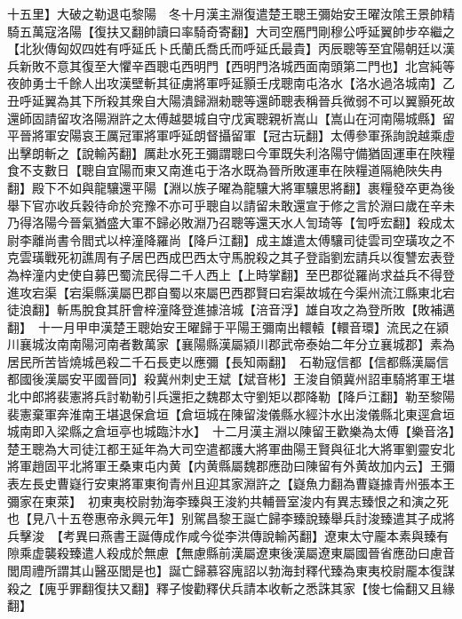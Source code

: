 十五里】大破之勒退屯黎陽　冬十月漢主淵復遣楚王聰王彌始安王曜汝隂王景帥精騎五萬寇洛陽【復扶又翻帥讀曰率騎奇寄翻】大司空鴈門剛穆公呼延翼帥步卒繼之【北狄傳匈奴四姓有呼延氏卜氏蘭氏喬氏而呼延氏最貴】丙辰聰等至宜陽朝廷以漢兵新敗不意其復至大懼辛酉聰屯西明門【西明門洛城西面南頭第二門也】北宫純等夜帥勇士千餘人出攻漢壁斬其征虜將軍呼延顥壬戌聰南屯洛水【洛水過洛城南】乙丑呼延翼為其下所殺其衆自大陽潰歸淵勑聰等還師聰表稱晉兵微弱不可以翼顥死故還師固請留攻洛陽淵許之太傅越嬰城自守戊寅聰親祈嵩山【嵩山在河南陽城縣】留平晉將軍安陽哀王厲冠軍將軍呼延朗督攝留軍【冠古玩翻】太傅參軍孫詢說越乘虛出擊朗斬之【說輸芮翻】厲赴水死王彌謂聰曰今軍既失利洛陽守備猶固運車在陜糧食不支數日【聰自宜陽而東又南進屯于洛水既為晉所敗運車在陜糧道隔絶陜失冉翻】殿下不如與龍驤還平陽【淵以族子曜為龍驤大將軍驤思將翻】裹糧發卒更為後舉下官亦收兵穀待命於兖豫不亦可乎聰自以請留未敢還宣于修之言於淵曰歲在辛未乃得洛陽今晉氣猶盛大軍不歸必敗淵乃召聰等還天水人訇琦等【訇呼宏翻】殺成太尉李離尚書令閻式以梓潼降羅尚【降戶江翻】成主雄遣太傅驤司徒雲司空璜攻之不克雲璜戰死初譙周有子居巴西成巴西太守馬脫殺之其子登詣劉宏請兵以復讐宏表登為梓潼内史使自募巴蜀流民得二千人西上【上時掌翻】至巴郡從羅尚求益兵不得登進攻宕渠【宕渠縣漢屬巴郡自蜀以來屬巴西郡賢曰宕渠故城在今渠州流江縣東北宕徒浪翻】斬馬脫食其肝會梓潼降登進據涪城【涪音浮】雄自攻之為登所敗【敗補邁翻】　十一月甲申漢楚王聰始安王曜歸于平陽王彌南出轘轅【轘音環】流民之在潁川襄城汝南南陽河南者數萬家【襄陽縣漢屬潁川郡武帝泰始二年分立襄城郡】素為居民所苦皆燒城邑殺二千石長吏以應彌【長知兩翻】　石勒寇信都【信都縣漢屬信都國後漢屬安平國晉同】殺冀州刺史王斌【斌音彬】王浚自領冀州詔車騎將軍王堪北中郎將裴憲將兵討勒勒引兵還拒之魏郡太守劉矩以郡降勒【降戶江翻】勒至黎陽裴憲棄軍奔淮南王堪退保倉垣【倉垣城在陳留浚儀縣水經汴水出浚儀縣北東逕倉垣城南即入梁縣之倉垣亭也城臨汴水】　十二月漢主淵以陳留王歡樂為太傅【樂音洛】楚王聰為大司徒江都王延年為大司空遣都護大將軍曲陽王賢與征北大將軍劉靈安北將軍趙固平北將軍王桑東屯内黄【内黄縣屬魏郡應劭曰陳留有外黄故加内云】王彌表左長史曹嶷行安東將軍東徇青州且迎其家淵許之【嶷魚力翻為曹嶷據青州張本王彌家在東萊】　初東夷校尉勃海李臻與王浚約共輔晉室浚内有異志臻恨之和演之死也【見八十五卷惠帝永興元年】别駕昌黎王誕亡歸李臻說臻舉兵討浚臻遣其子成將兵擊浚　【考異曰燕書王誕傳成作咸今從李洪傳說輸芮翻】遼東太守龎本素與臻有隙乘虚襲殺臻遣人殺成於無慮【無慮縣前漢屬遼東後漢屬遼東屬國晉省應劭曰慮音閭周禮所謂其山醫巫閭是也】誕亡歸慕容廆詔以勃海封釋代臻為東夷校尉龎本復謀殺之【廆乎罪翻復扶又翻】釋子悛勸釋伏兵請本收斬之悉誅其家【悛七倫翻又且緣翻】

